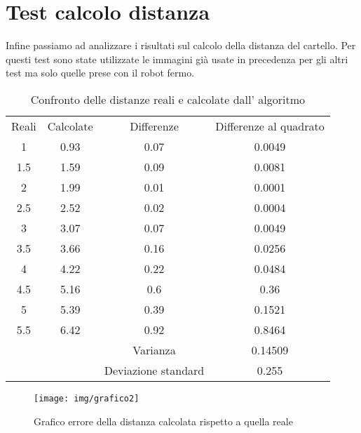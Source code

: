 \section{Test calcolo distanza}

	Infine passiamo ad analizzare i risultati sul calcolo della distanza del cartello. Per questi test sono state utilizzate le immagini già usate in precedenza per gli altri test ma solo quelle prese con il robot fermo.

	\begin{table}[h]
		\centering
		\begin{tabular}{cccc}
		    Reali & Calcolate & Differenze & Differenze al quadrato \\
			1 	&   0.93	& 0.07		& 0.0049    	\\
			1.5 &   1.59    & 0.09 		& 0.0081 		\\
			2 	& 	1.99	& 0.01		& 0.0001 		\\
			2.5 &   2.52	& 0.02		& 0.0004		\\
			3	&   3.07	& 0.07		& 0.0049		\\
			3.5 &   3.66	& 0.16		& 0.0256		\\
			4 	&   4.22	& 0.22		& 0.0484		\\
			4.5 &   5.16	& 0.6		& 0.36			\\
			5 	&   5.39	& 0.39		& 0.1521		\\
			5.5 &   6.42	& 0.92		& 0.8464		\\
			\hline
			& & Varianza & 0.14509 \\
			& & Deviazione standard & 0.255 \\

		\end{tabular}
		\caption{Confronto delle distanze reali e calcolate dall' algoritmo}
	\end{table}

	\begin{figure}[!ht]
		\centering
		\texttt{[image: img/grafico2]}
		\caption{Grafico errore della distanza calcolata rispetto a quella reale }
	\end{figure}

